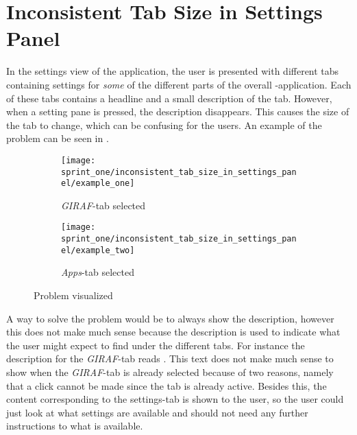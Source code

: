 
\section{Inconsistent Tab Size in Settings Panel}
\label{sec:inconsistent_tab_size_in_settings_panel}

In the settings view of the \launcher application, the user is presented with different tabs containing settings for \emph{some} of the different parts of the overall \giraf-application. Each of these tabs contains a headline and a small description of the tab. However, when a setting pane is pressed, the description disappears. This causes the size of the tab to change, which can be confusing for the users. An example of the problem can be seen in . \\

\begin{figure}[!htbp]
    \centering

    \begin{subfigure}[t]{0.3\textwidth}
        \texttt{[image: sprint\_one/inconsistent\_tab\_size\_in\_settings\_panel/example\_one]}
        \caption{\emph{GIRAF}-tab selected}
        \label{fig:inconsistent_tab_size_in_settings_panel_example_one}
    \end{subfigure}
    \hspace{5em} 
    \begin{subfigure}[t]{0.3\textwidth}
        \texttt{[image: sprint\_one/inconsistent\_tab\_size\_in\_settings\_panel/example\_two]}
        \caption{\emph{Apps}-tab selected}
        \label{fig:inconsistent_tab_size_in_settings_panel_example_two}
    \end{subfigure}
    
    \caption{Problem visualized}
    \label{fig:inconsistent_tab_size_in_settings_panel_example}
\end{figure}

A way to solve the problem would be to always show the description, however this does not make much sense because the description is used to indicate what the user might expect to find under the different tabs. For instance the description for the \emph{GIRAF}-tab reads . This text does not make much sense to show when the \emph{GIRAF}-tab is already selected because of two reasons, namely that a click cannot be made since the tab is already active. Besides this, the content corresponding to the settings-tab is shown to the user, so the user could just look at what settings are available and should not need any further instructions to what is available. \\

